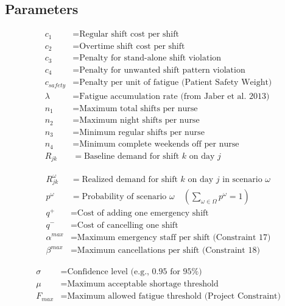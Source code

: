 \documentclass[12pt,a4paper]{article}
\begin{document}
\subsection{Parameters}

\begin{tcolorbox}[title=Stage 1 Parameters]
\begin{align*}
c_1 &= \text{Regular shift cost per shift} \\
c_2 &= \text{Overtime shift cost per shift} \\
c_3 &= \text{Penalty for stand-alone shift violation} \\
c_4 &= \text{Penalty for unwanted shift pattern violation} \\
c_{safety} &= \text{Penalty per unit of fatigue (Patient Safety Weight)} \\
\lambda &= \text{Fatigue accumulation rate (from Jaber et al. 2013)} \\
n_1 &= \text{Maximum total shifts per nurse} \\
n_2 &= \text{Maximum night shifts per nurse} \\
n_3 &= \text{Minimum regular shifts per nurse} \\
n_4 &= \text{Minimum complete weekends off per nurse} \\
R_{jk} &= \text{Baseline demand for shift } k \text{ on day } j
\end{align*}
\end{tcolorbox}

\begin{tcolorbox}[title=Stage 2 Parameters]
\begin{align*}
R_{jk}^\omega &= \text{Realized demand for shift } k \text{ on day } j \text{ in scenario } \omega \\
p^\omega &= \text{Probability of scenario } \omega \quad \left(\sum_{\omega \in \Omega} p^\omega = 1\right) \\
q^+ &= \text{Cost of adding one emergency shift} \\
q^- &= \text{Cost of cancelling one shift} \\
\alpha^{max} &= \text{Maximum emergency staff per shift (Constraint 17)} \\
\beta^{max} &= \text{Maximum cancellations per shift (Constraint 18)}
\end{align*}
\end{tcolorbox}

\begin{tcolorbox}[title=CVaR Parameters]
\begin{align*}
\sigma &= \text{Confidence level (e.g., 0.95 for 95\%)} \\
\mu &= \text{Maximum acceptable shortage threshold} \\
F_{max} &= \text{Maximum allowed fatigue threshold (Project Constraint)}
\end{align*}
\end{tcolorbox}
\end{document}
